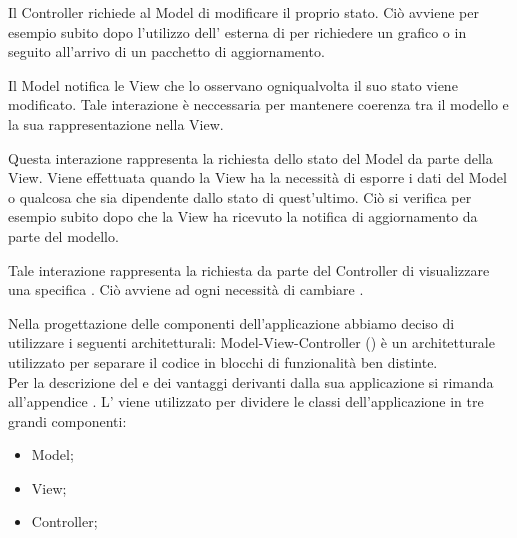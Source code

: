 	    Il Controller richiede al Model di modificare il proprio stato. Ciò avviene per esempio subito dopo l'utilizzo dell' esterna di  per richiedere un grafico o in seguito all'arrivo di un pacchetto di aggiornamento.

	    Il Model notifica le View che lo osservano ogniqualvolta il suo stato viene modificato. Tale interazione è neccessaria per mantenere coerenza tra il modello e la sua rappresentazione nella View. 

	   	Questa interazione rappresenta la richiesta dello stato del Model da parte della View. Viene effettuata quando la View ha la necessità di esporre i dati del Model o qualcosa che sia dipendente dallo stato di quest'ultimo. Ciò si verifica per esempio subito dopo che la View ha ricevuto la notifica di aggiornamento da parte del modello.

	   	Tale interazione rappresenta la richiesta da parte del Controller di visualizzare una specifica . Ciò avviene ad ogni necessità di cambiare .
        
    Nella progettazione delle componenti dell'applicazione  abbiamo deciso di utilizzare i seguenti  architetturali:
        Model-View-Controller () è un  architetturale utilizzato per separare il codice in blocchi di funzionalità ben distinte.\\
        Per la descrizione del  e dei vantaggi derivanti dalla sua applicazione si rimanda all'appendice .
        L' viene utilizzato per dividere le classi dell'applicazione  in tre grandi componenti:
        \begin{itemize}
        \item Model;
        \item View;
        \item Controller;
        \end{itemize}

